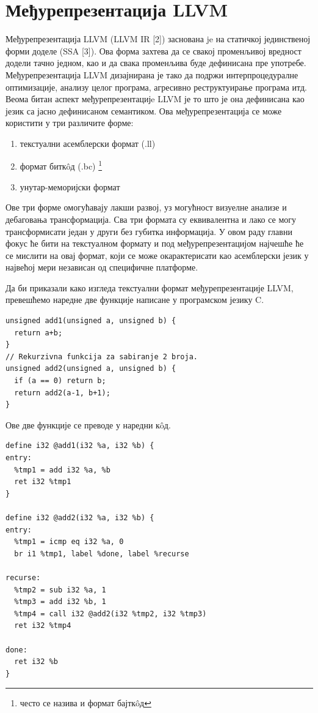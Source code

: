 \documentclass[12pt,oneside]{memoir}
\begin{document}
\section{Међурепрезентација LLVM}
Међурепрезентација LLVM (LLVM IR [2]) заснована je на статичкој 
јединственој форми доделе (SSA [3]).
Ова форма захтева да се свакој променљивој вредност додели тачно једном, као и да
свака променљива буде дефинисана пре употребе.
Међурепрезентација LLVM дизајнирана је тако да подржи интерпроцедуралне оптимизације,
анализу целог програма, агресивно реструктуирање програма итд.
Веома битан аспект међурепрезентацијe LLVM је то што је она дефинисана као 
језик са јасно дефинисаном семантиком.
Ова међурепрезентација се може користити у три различите форме: 
\begin{enumerate}
\item текстуални асемблерски формат (.ll)
\item формат битк\^{o}д (.bc) \footnote{често се назива и формат бајтк\^{o}д}
\item унутар-меморијски формат 
\end{enumerate} 
Ове три форме омогућавају лакши развој, уз могућност
визуелне анализе и дебаговања трансформација. 
Сва три формата су еквивалентна и лако се могу трансформисати један у други без
губитка информација. 
У овом раду главни фокус ће бити на текстуалном формату и под међурепрезентацијом
 најчешће ће се мислити на овај формат, који се може окарактерисати као асемблерски 
језик у највећој мери независан од специфичне платформе.

Да би приказали како изгледа текстуални формат међурепрезентације LLVM,
превешћемо наредне две функције написане у програмском језику C.
\begin{lstlisting}[frame=single]
unsigned add1(unsigned a, unsigned b) {
  return a+b;
}
// Rekurzivna funkcija za sabiranje 2 broja.
unsigned add2(unsigned a, unsigned b) {
  if (a == 0) return b;
  return add2(a-1, b+1);
}
\end{lstlisting}
\pagebreak
Ове две функције се преводе у наредни к\^{o}д.
\begin{lstlisting}[frame=single,caption={К\^{o}д преузет са чланка  \textit{LLVM - The archicture of open source applications} [15]}, captionpos=b]
define i32 @add1(i32 %a, i32 %b) {
entry:
  %tmp1 = add i32 %a, %b
  ret i32 %tmp1
}

define i32 @add2(i32 %a, i32 %b) {
entry:
  %tmp1 = icmp eq i32 %a, 0
  br i1 %tmp1, label %done, label %recurse

recurse:
  %tmp2 = sub i32 %a, 1
  %tmp3 = add i32 %b, 1
  %tmp4 = call i32 @add2(i32 %tmp2, i32 %tmp3)
  ret i32 %tmp4

done:
  ret i32 %b
}
\end{lstlisting}
\end{document}

